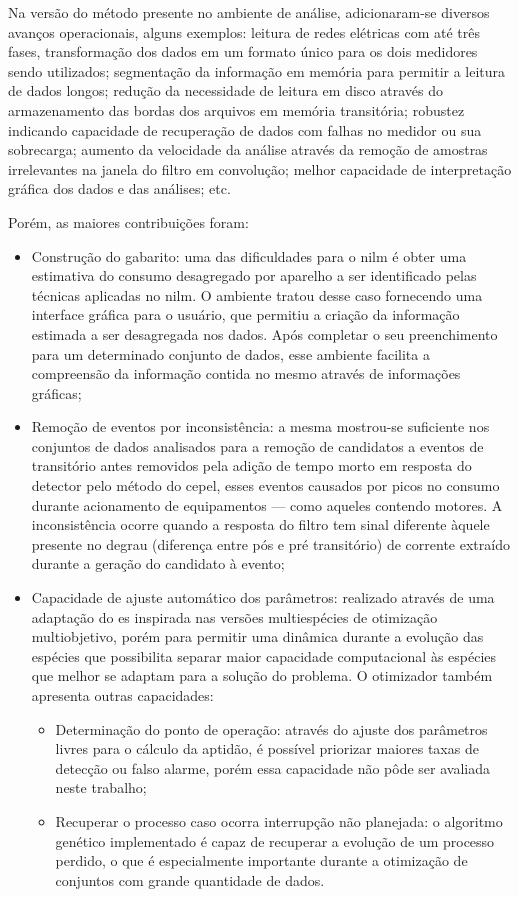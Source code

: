 Na versão do método presente no ambiente de análise,
adicionaram-se diversos avanços operacionais, alguns exemplos:
leitura de redes elétricas com até três fases, transformação dos dados
em um formato único para os dois medidores sendo utilizados;
segmentação da informação em memória para permitir a leitura de dados
longos; redução da necessidade de leitura em disco através do
armazenamento das bordas dos arquivos em memória transitória;
robustez indicando capacidade de recuperação de dados com falhas no
medidor ou sua sobrecarga; aumento da velocidade da análise através da
remoção de amostras irrelevantes na janela do filtro em convolução;
melhor capacidade de interpretação gráfica dos dados e das análises; etc.

Porém, as maiores contribuições foram:

\begin{itemize}
\item Construção do gabarito: uma das dificuldades para o \acs{nilm} é
obter uma estimativa do consumo desagregado por aparelho a ser
identificado pelas técnicas aplicadas no \acs{nilm}. O ambiente tratou
desse caso fornecendo uma interface gráfica para o usuário, que
permitiu a criação da informação estimada a ser desagregada nos dados.
Após completar o seu preenchimento para um determinado conjunto de
dados, esse ambiente facilita a compreensão da informação contida no
mesmo através de informações gráficas;
\item Remoção de eventos por inconsistência: a mesma mostrou-se
suficiente nos conjuntos de dados analisados para a remoção de
candidatos a eventos de transitório antes removidos pela adição de
tempo morto em resposta do detector pelo método do \acs{cepel},
esses eventos causados por picos no consumo durante acionamento de
equipamentos --- como aqueles contendo motores. A inconsistência
ocorre quando a resposta do filtro tem sinal diferente àquele presente
no degrau (diferença entre pós e pré transitório) de corrente extraído
durante a geração do candidato à evento;
\item Capacidade de ajuste automático dos parâmetros: realizado
através de uma adaptação do \acl{es} inspirada nas versões
multiespécies de otimização multiobjetivo, porém para permitir uma
dinâmica durante a evolução das espécies que possibilita separar
maior capacidade computacional às espécies que melhor se adaptam para
a solução do problema. O otimizador também apresenta outras capacidades:
\begin{itemize}
\item Determinação do ponto de operação: através do ajuste dos
parâmetros livres para o cálculo da aptidão, é possível priorizar
maiores taxas de detecção ou falso alarme, porém essa capacidade não
pôde ser avaliada neste trabalho;
\item Recuperar o processo caso ocorra interrupção não planejada: o
algoritmo genético implementado é capaz de recuperar a evolução de um
processo perdido, o que é especialmente importante durante a
otimização de conjuntos com grande quantidade de dados.
\end{itemize}
\end{itemize}

